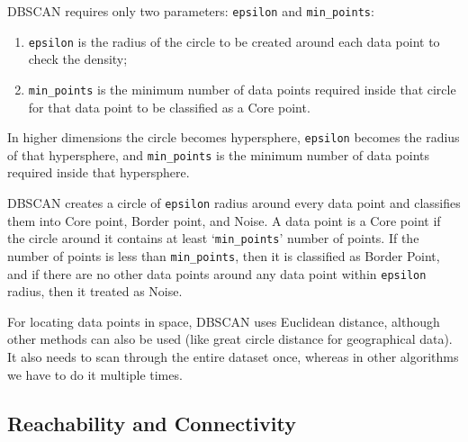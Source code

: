 \documentclass[10pt,a4paper]{book}
\begin{document}
DBSCAN requires only two parameters: \verb-epsilon- and \verb-min_points-:
\begin{enumerate} 
	\item \verb-epsilon- is the radius of the circle to be created around each data point to check the density;
	\item \verb-min_points- is the minimum number of data points required inside that circle for that data point to be classified as a Core point.
\end{enumerate}

In higher dimensions the circle becomes hypersphere, \verb-epsilon- becomes the radius of that hypersphere, and \verb-min_points- is the minimum number of data points required inside that hypersphere.

DBSCAN creates a circle of \verb-epsilon- radius around every data point and classifies them into Core point, Border point, and Noise. A data point is a Core point if the circle around it contains at least ‘\verb-min_points-’ number of points. If the number of points is less than \verb-min_points-, then it is classified as Border Point, and if there are no other data points around any data point within \verb-epsilon- radius, then it treated as Noise.

For locating data points in space, DBSCAN uses Euclidean distance, although other methods can also be used (like great circle distance for geographical data). It also needs to scan through the entire dataset once, whereas in other algorithms we have to do it multiple times.

\subsection{Reachability and Connectivity}
\end{document}
